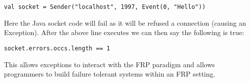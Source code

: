 \begin{verbatim}
val socket = Sender("localhost", 1997, Event(0, "Hello")) 
\end{verbatim}

  Here the Java socket code will fail as it will be refused a connection (causing an Exception). After the above line 
  executes we can then say the following is true:

\begin{verbatim}
socket.errors.occs.length == 1 
\end{verbatim}

  This allows exceptions to interact with the FRP paradigm and allows programmers to build failure tolerant systems within 
  an FRP setting.